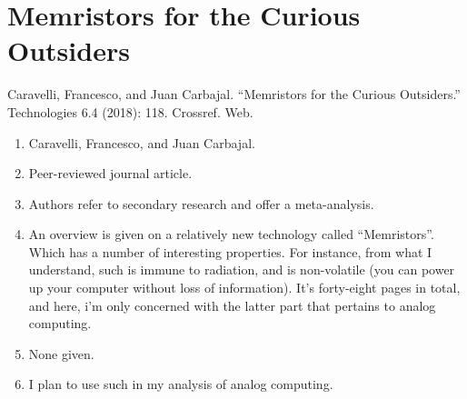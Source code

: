 


\section*{Memristors for the Curious Outsiders}

Caravelli, Francesco, and Juan Carbajal. “Memristors for the Curious Outsiders.” Technologies 6.4 (2018): 118. Crossref. Web.

\begin{enumerate}
    \item Caravelli, Francesco, and Juan Carbajal.
    \item Peer-reviewed journal article.
    \item Authors refer to secondary research and offer a meta-analysis.
    \item An overview is given on a relatively new technology called ``Memristors''. Which has a number of interesting properties. For instance, from what I understand, such is immune to radiation, and is non-volatile (you can power up your computer without loss of information). It's forty-eight pages in total, and here, i'm only concerned with the latter part that pertains to analog computing. 
    \item None given. 
    \item I plan to use such in my analysis of analog computing. 
\end{enumerate}



